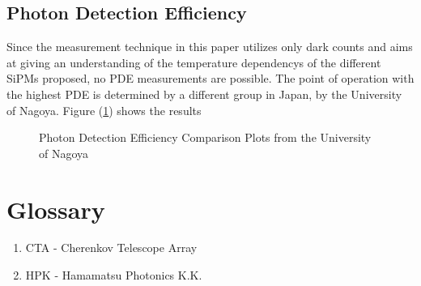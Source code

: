 \documentclass[article,type=msc,colorback,accentcolor=tud9c]{tudthesis}
\begin{document}
\subsection{Photon Detection Efficiency}

Since the measurement technique in this paper utilizes only dark counts and aims at giving an understanding of the temperature dependencys of the different SiPMs proposed, no PDE measurements are possible. The point of operation with the highest PDE is determined by a different group in Japan, by the University of Nagoya. Figure (\ref{fig:Nagoya_PDE}) shows the results


\begin{figure}[h]
\begin{centering}
\caption{Photon Detection Efficiency Comparison Plots from the University of Nagoya}
\label{fig:Nagoya_PDE}
\end{centering}
\end{figure}


\newpage
\section{Glossary}
\begin{enumerate}
\item CTA - Cherenkov Telescope Array
\item HPK - Hamamatsu Photonics K.K.
\end{enumerate}











\newpage
\end{document}
